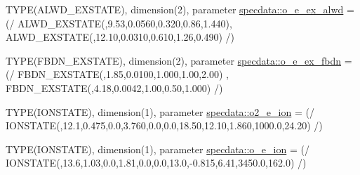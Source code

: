 \begin{DoxyCompactItemize}
\item 
TYPE(ALWD\_\-EXSTATE), dimension(2), parameter \hyperlink{namespacespecdata_ac6de9abf8a4350031cdeed967f2b21b6}{specdata::o\_\-e\_\-ex\_\-alwd} = (/ ALWD\_\-EXSTATE(,9.53,0.0560,0.320,0.86,1.440), ALWD\_\-EXSTATE(,12.10,0.0310,0.610,1.26,0.490) /)
\item 
TYPE(FBDN\_\-EXSTATE), dimension(2), parameter \hyperlink{namespacespecdata_a31f902ca9efd2ca7817a66af34743c3d}{specdata::o\_\-e\_\-ex\_\-fbdn} = (/ FBDN\_\-EXSTATE(,1.85,0.0100,1.000,1.00,2.00) , FBDN\_\-EXSTATE(,4.18,0.0042,1.00,0.50,1.000) /)
\item 
TYPE(IONSTATE), dimension(1), parameter \hyperlink{namespacespecdata_a7040a4bcf92d1e17f6158536ca8d5b0a}{specdata::o2\_\-e\_\-ion} = (/ IONSTATE(,12.1,0.475,0.0,3.760,0.0,0.0,18.50,12.10,1.860,1000.0,24.20) /)
\item 
TYPE(IONSTATE), dimension(1), parameter \hyperlink{namespacespecdata_aa92d120444752fc22443b31d087da308}{specdata::o\_\-e\_\-ion} = (/ IONSTATE(,13.6,1.03,0.0,1.81,0.0,0.0,13.0,-\/0.815,6.41,3450.0,162.0) /)
\end{DoxyCompactItemize}
